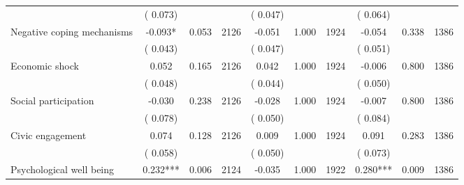 \begin{tabular}{l*{9}{c}}
                               &        (       0.073) & &                                                                 &       (       0.047) & &                                                          &       (       0.064) & &  \\ 
 Negative coping mechanisms                 &             -0.093*          &        0.053 & 2126          &             -0.051 &        1.000 & 1924                   &       -0.054 &        0.338 & 1386                 \\ 
                               &        (       0.043) & &                                                                 &       (       0.047) & &                                                          &       (       0.051) & &  \\ 
 Economic shock                 &              0.052          &        0.165 & 2126          &              0.042 &        1.000 & 1924                   &       -0.006 &        0.800 & 1386                 \\ 
                               &        (       0.048) & &                                                                 &       (       0.044) & &                                                          &       (       0.050) & &   \\ 
 Social participation                 &             -0.030          &        0.238 & 2126          &             -0.028 &        1.000 & 1924                   &       -0.007 &        0.800 & 1386                 \\ 
                               &        (       0.078) & &                                                                 &       (       0.050) & &                                                          &       (       0.084) & &   \\ 
 Civic engagement                 &              0.074          &        0.128 & 2126          &              0.009 &        1.000 & 1924                   &        0.091 &        0.283 & 1386                 \\ 
                               &        (       0.058) & &                                                                 &       (       0.050) & &                                                          &       (       0.073) & &  \\ 
 Psychological well being                &              0.232***        &        0.006 & 2124        &             -0.035 &        1.000 & 1922               &        0.280*** &        0.009 & 1386       \\ 

\end{tabular}
